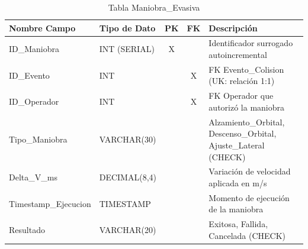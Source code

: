 \begin{table}[H]
\centering
\footnotesize
\begin{tabular}{|l|l|c|c|p{5cm}|}
\hline
\textbf{Nombre Campo} & \textbf{Tipo de Dato} & \textbf{PK} & \textbf{FK} & \textbf{Descripción} \\
\hline
ID\_Maniobra & INT (SERIAL) & X & & Identificador surrogado autoincremental \\
\hline
ID\_Evento & INT & & X & FK Evento\_Colision (UK: relación 1:1) \\
\hline
ID\_Operador & INT & & X & FK Operador que autorizó la maniobra \\
\hline
Tipo\_Maniobra & VARCHAR(30) & & & Alzamiento\_Orbital, Descenso\_Orbital, Ajuste\_Lateral (CHECK) \\
\hline
Delta\_V\_ms & DECIMAL(8,4) & & & Variación de velocidad aplicada en m/s \\
\hline
Timestamp\_Ejecucion & TIMESTAMP & & & Momento de ejecución de la maniobra \\
\hline
Resultado & VARCHAR(20) & & & Exitosa, Fallida, Cancelada (CHECK) \\
\hline
\end{tabular}
\caption{Tabla Maniobra\_Evasiva}
\end{table}
